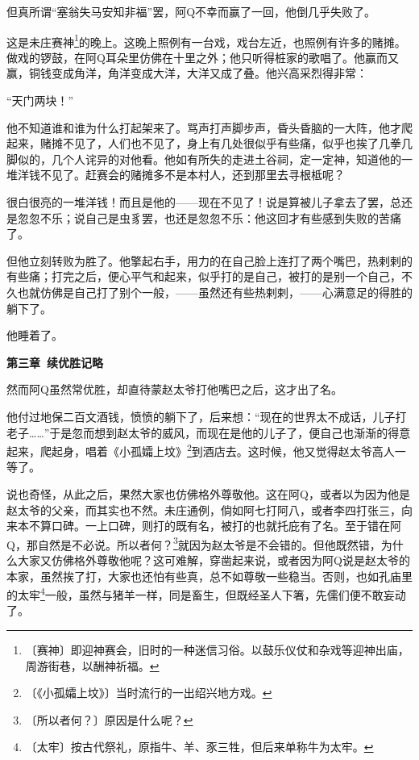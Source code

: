 \documentclass[12pt,UTF-8,openany]{ctexbook}
\begin{document}
\begin{normalsize}
    但真所谓“塞翁失马安知非福”罢，阿Q不幸而赢了一回，他倒几乎失败了。
    
    这是未庄赛神\footnote{〔赛神〕即迎神赛会，旧时的一种迷信习俗。以鼓乐仪仗和杂戏等迎神出庙，周游街巷，以酬神祈福。}的晚上。这晚上照例有一台戏，戏台左近，也照例有许多的赌摊。做戏的锣鼓，在阿Q耳朵里仿佛在十里之外；他只听得桩家的歌唱了。他赢而又赢，铜钱变成角洋，角洋变成大洋，大洋又成了叠。他兴高采烈得非常：
    
    “天门两块！”
    
    他不知道谁和谁为什么打起架来了。骂声打声脚步声，昏头昏脑的一大阵，他才爬起来，赌摊不见了，人们也不见了，身上有几处很似乎有些痛，似乎也挨了几拳几脚似的，几个人诧异的对他看。他如有所失的走进土谷祠，定一定神，知道他的一堆洋钱不见了。赶赛会的赌摊多不是本村人，还到那里去寻根柢呢？
    
    很白很亮的一堆洋钱！而且是他的——现在不见了！说是算被儿子拿去了罢，总还是忽忽不乐；说自己是虫豸罢，也还是忽忽不乐：他这回才有些感到失败的苦痛了。
    
    但他立刻转败为胜了。他擎起右手，用力的在自己脸上连打了两个嘴巴，热剌剌的有些痛；打完之后，便心平气和起来，似乎打的是自己，被打的是别一个自己，不久也就仿佛是自己打了别个一般，——虽然还有些热剌剌，——心满意足的得胜的躺下了。
    
    他睡着了。
    
    \begin{center}\textbf{第三章~续优胜记略}\end{center}
    
    然而阿Q虽然常优胜，却直待蒙赵太爷打他嘴巴之后，这才出了名。
    
    他付过地保二百文酒钱，愤愤的躺下了，后来想：“现在的世界太不成话，儿子打老子……”于是忽而想到赵太爷的威风，而现在是他的儿子了，便自己也渐渐的得意起来，爬起身，唱着《小孤孀上坟》\footnote{〔《小孤孀上坟》〕当时流行的一出绍兴地方戏。}到酒店去。这时候，他又觉得赵太爷高人一等了。
    
    说也奇怪，从此之后，果然大家也仿佛格外尊敬他。这在阿Q，或者以为因为他是赵太爷的父亲，而其实也不然。未庄通例，倘如阿七打阿八，或者李四打张三，向来本不算口碑。一上口碑，则打的既有名，被打的也就托庇有了名。至于错在阿Q，那自然是不必说。所以者何？\footnote{〔所以者何？〕原因是什么呢？}就因为赵太爷是不会错的。但他既然错，为什么大家又仿佛格外尊敬他呢？这可难解，穿凿起来说，或者因为阿Q说是赵太爷的本家，虽然挨了打，大家也还怕有些真，总不如尊敬一些稳当。否则，也如孔庙里的太牢\footnote{〔太牢〕按古代祭礼，原指牛、羊、豕三牲，但后来单称牛为太牢。}一般，虽然与猪羊一样，同是畜生，但既经圣人下箸，先儒们便不敢妄动了。
    

\end{normalsize}
\end{document}

